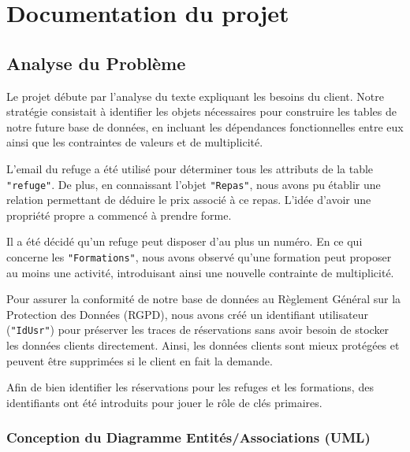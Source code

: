 \chapter{Documentation du projet}
\section{Analyse du Problème}

Le projet débute par l'analyse du texte expliquant les besoins du client. Notre stratégie consistait à identifier les objets nécessaires pour construire les tables de notre future base de données, en incluant les dépendances fonctionnelles entre eux ainsi que les contraintes de valeurs et de multiplicité.

L'email du refuge a été utilisé pour déterminer tous les attributs de la table \texttt{"refuge"}. De plus, en connaissant l'objet \texttt{"Repas"}, nous avons pu établir une relation permettant de déduire le prix associé à ce repas. L'idée d'avoir une propriété propre a commencé à prendre forme.

Il a été décidé qu'un refuge peut disposer d'au plus un numéro. En ce qui concerne les \texttt{"Formations"}, nous avons observé qu'une formation peut proposer au moins une activité, introduisant ainsi une nouvelle contrainte de multiplicité.

Pour assurer la conformité de notre base de données au Règlement Général sur la Protection des Données (RGPD), nous avons créé un identifiant utilisateur (\texttt{"IdUsr"}) pour préserver les traces de réservations sans avoir besoin de stocker les données clients directement. Ainsi, les données clients sont mieux protégées et peuvent être supprimées si le client en fait la demande.

Afin de bien identifier les réservations pour les refuges et les formations, des identifiants ont été introduits pour jouer le rôle de clés primaires.

















\subsection{Conception du Diagramme Entités/Associations (UML)}

